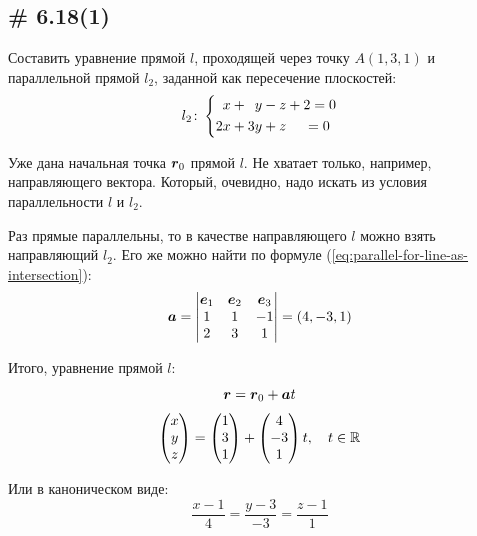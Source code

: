 \documentclass[a4paper,12pt]{article}
\begin{document}
  
  
  \subsection{\# 6.18(1)}
  
  \begin{problem}
    Составить уравнение прямой $l$, проходящей через точку $A(1, 3, 1)$ и параллельной прямой $l_2$, заданной как пересечение плоскостей:
    \[
      l_2\colon \left\{
        \begin{aligned}
          &\hphantom{2}x + \hphantom{3}y - z + 2 = 0\\
          &2x            + 3y            + z \hphantom{+ 2} = 0
        \end{aligned}
      \right.
    \]
  \end{problem}
  
  \begin{solution}
    Уже дана начальная точка $\boldsymbol r_0$ прямой $l$.
    Не хватает только, например, направляющего вектора.
    Который, очевидно, надо искать из условия параллельности $l$ и $l_2$.
    
    Раз прямые параллельны, то в качестве направляющего $l$ можно взять направляющий $l_2$.
    Его же можно найти по формуле (\ref{eq:parallel-for-line-as-intersection}):
    \[
      \boldsymbol a = \begin{vmatrix}
        \boldsymbol e_1 & \boldsymbol e_2 & \boldsymbol e_3\\
        1        & 1        & -1\\
        2        & 3        & 1
      \end{vmatrix}
      = (4, -3, 1)
    \]
    
    Итого, уравнение прямой $l$:
    \[
      \boldsymbol r = \boldsymbol r_0 + \boldsymbol a t
    \]
    \[
      \begin{pmatrix}
        x \\ y \\ z
      \end{pmatrix}
      = \begin{pmatrix}
        1 \\ 3 \\ 1
      \end{pmatrix}
      + \begin{pmatrix}
        4 \\ -3 \\ 1
      \end{pmatrix} t,\quad t \in \operatorname{\mathbb R}
    \]
    
    Или в каноническом виде:
    \[
      \frac{x - 1}{4} = \frac{y - 3}{-3} = \frac{z - 1}{1}
    \]
  \end{solution}
  
\end{document}
